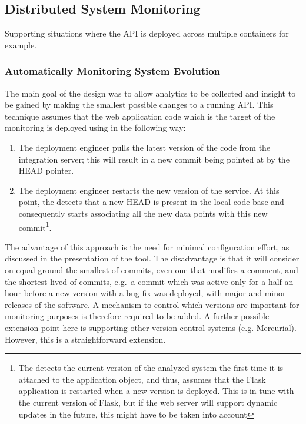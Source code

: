   \subsection{Distributed System Monitoring}
  Supporting situations where the API is deployed across multiple containers for example.


  \subsubsection{Automatically Monitoring System Evolution}

  The main goal of the \tool design was to allow analytics to be collected and insight to be gained by making the smallest possible changes to a running API. %
%
  This technique assumes that the web application code which is the target of the monitoring is deployed using \git in the following way: 

  \begin{enumerate}
    \item The deployment engineer pulls the latest version of the code from the integration server; this will result in a new commit being pointed at by the HEAD pointer. %
    \item The deployment engineer restarts the new version of the service. At this point, the \tool detects that a new HEAD is present in the local code base and consequently starts associating all the new data points with this new commit\footnote{The \tool detects the current version of the analyzed system the first time it is attached to the application object, and thus, assumes that the Flask application is restarted when a new version is deployed. This is in tune with the current version of Flask, but if the web server will support dynamic updates in the future, this might have to be taken into account}.
  \end{enumerate}

  The advantage of this approach is the need for minimal configuration effort, as discussed in the presentation of the tool. The disadvantage is that it will consider on equal ground the smallest of commits, even one that modifies a comment, and the shortest lived of commits, e.g.~a commit which was active only for a half an hour before a new version with a bug fix was deployed, with major and minor releases of the software. %
  A mechanism to control which versions are important for monitoring purposes is therefore required to be added.
%
  A further possible extension point here is supporting other version control systems (e.g. Mercurial). However, this is a straightforward extension.


